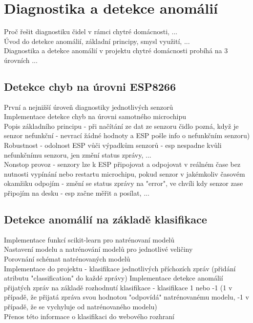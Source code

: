 \chapter{Diagnostika a detekce anomálií} \label{chap:methods}

Proč řešit diagnostiku čidel v rámci chytré domácnosti, ... \\
Úvod do detekce anomálií, základní principy, smysl využití, ... \\
Diagnostika a detekce anomálií v projektu chytré domácnosti probíhá na 3 úrovních ... \\

\section{Detekce chyb na úrovni ESP8266} \label{sec:error_detection_esp}

První a nejnižší úroveň diagnostiky jednotlivých senzorů \\
Implementace detekce chyb na úrovni samotného microchipu \\
Popis základního principu - při načítání ze dat ze senzoru čidlo pozná, když je senzor nefunkční - nevrací  žádné hodnoty a ESP pošle info o nefunkčním senzoru) \\
Robustnost - odolnost ESP vůči výpadkům senzorů - esp nespadne kvůli nefunkčnímu senzoru, jen změní status zprávy, ... \\
Nonstop provoz - senzory lze k ESP připojovat a odpojovat v reálném čase bez nutnosti vypínání nebo restartu microchipu, pokud senzor v jakémkoliv časovém okamžiku odpojím - změní se status zprávy na "error", ve chvíli kdy senzor zase připojím na desku - esp začne měřit a posílat, ... \\

\section{Detekce anomálií na základě klasifikace} \label{sec:detection_classification}

Implementace funkcí scikit-learn pro natrénovaní modelů \\
Nastavení modelu a natrénování modelů pro jednotlivé veličiny \\
Porovnání schémat natrénovaných modelů \\
Implementace do projektu - klasifikace jednotlivých příchozích zpráv (přidání atributu "classification" do každé zprávy)
Implementace detekce anomálií přijatých zpráv na základě rozhodnutí klasifikace - klasifikace 1 nebo -1 (1 v případě, že přijatá zpráva svou hodnotou "odpovídá" natrénovanému modelu, -1 v případě, že se vychyluje od natrénovaného modelu) \\
Přenos této informace o klasifikaci do webového rozhraní \\

